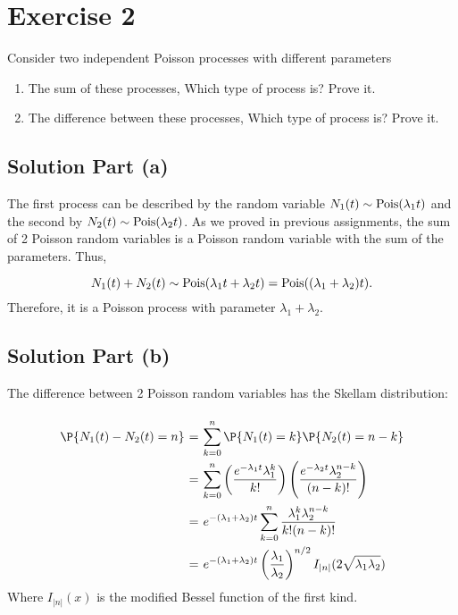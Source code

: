 \section{Exercise 2}

Consider two independent Poisson processes with different parameters

\begin{enumerate}[label=(\alph*)]
    \item The sum of these processes, Which type of process is? Prove it.
    \item The difference between these processes, Which type of process is? Prove it.
\end{enumerate}

\subsection*{Solution Part (a)}

The first process can be described by the random variable $N_1(t) \sim \hbox{Pois}(\lambda_1 t)$ and the second by $N_2(t) \sim \hbox{Pois}(\lambda_2 t)$. As we proved in previous assignments, the sum of 2 Poisson random variables is a Poisson random variable with the sum of the parameters. Thus,

\[ N_1(t) + N_2(t) \sim \hbox{Pois}(\lambda_1 t + \lambda_2 t) = \hbox{Pois}((\lambda_1 + \lambda_2) t). \]
Therefore, it is a Poisson process with parameter $\lambda_1+\lambda_2$.

\subsection*{Solution Part (b)}

The difference between 2 Poisson random variables has the Skellam distribution:

\[ \everymath{\displaystyle}
\arraycolsep=1.8pt\def\arraystretch{2.5}
\begin{array}{rcl}
    \P\{N_1(t) - N_2(t) = n\} & = & \sum_{k = 0}^{n} \P\{N_1(t) = k\}\P\{N_2(t) = n-k\}\\
    & = & \sum_{k = 0}^{n} \left( \frac{e^{-\lambda_1 t} \lambda_1^k}{k!} \right)\left( \frac{e^{-\lambda_2 t} \lambda_2^{n-k}}{(n-k)!} \right)\\
    & = & e^{-(\lambda_1+\lambda_2)t} \sum_{k = 0}^{n} \frac{\lambda_1^k \lambda_2^{n-k}}{k!(n-k)!}\\
    & = & e^{-(\lambda_1+\lambda_2)t} \left( \frac{\lambda_1}{\lambda_2} \right)^{n/2} I_{|n|}(2\sqrt{\lambda_1 \lambda_2})
\end{array} \]
Where $I_{|n|}(x)$ is the modified Bessel function of the first kind.
